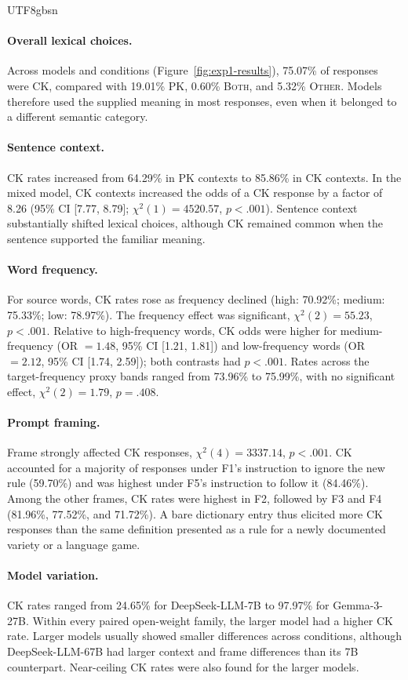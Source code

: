 \documentclass[11pt]{article}
\begin{document}
\begin{CJK*}{UTF8}{gbsn}
\paragraph{Overall lexical choices.}
Across models and conditions (Figure~\ref{fig:exp1-results}), 75.07\% of responses were \textsc{CK}, compared with 19.01\% \textsc{PK}, 0.60\% \textsc{Both}, and 5.32\% \textsc{Other}. Models therefore used the supplied meaning in most responses, even when it belonged to a different semantic category.

\paragraph{Sentence context.}
CK rates increased from 64.29\% in PK contexts to 85.86\% in CK contexts. In the mixed model, CK contexts increased the odds of a CK response by a factor of 8.26 (95\% CI [7.77, 8.79]; $\chi^2(1)=4520.57$, $p<.001$). Sentence context substantially shifted lexical choices, although CK remained common when the sentence supported the familiar meaning.

\paragraph{Word frequency.}
For source words, CK rates rose as frequency declined (high: 70.92\%; medium: 75.33\%; low: 78.97\%). The frequency effect was significant, $\chi^2(2)=55.23$, $p<.001$. Relative to high-frequency words, CK odds were higher for medium-frequency (OR $=1.48$, 95\% CI [1.21, 1.81]) and low-frequency words (OR $=2.12$, 95\% CI [1.74, 2.59]); both contrasts had $p<.001$. Rates across the target-frequency proxy bands ranged from 73.96\% to 75.99\%, with no significant effect, $\chi^2(2)=1.79$, $p=.408$.

\paragraph{Prompt framing.}
Frame strongly affected CK responses, $\chi^2(4)=3337.14$, $p<.001$. CK accounted for a majority of responses under F1's instruction to ignore the new rule (59.70\%) and was highest under F5's instruction to follow it (84.46\%). Among the other frames, CK rates were highest in F2, followed by F3 and F4 (81.96\%, 77.52\%, and 71.72\%). A bare dictionary entry thus elicited more CK responses than the same definition presented as a rule for a newly documented variety or a language game.

\paragraph{Model variation.}
CK rates ranged from 24.65\% for DeepSeek-LLM-7B to 97.97\% for Gemma-3-27B. Within every paired open-weight family, the larger model had a higher CK rate. Larger models usually showed smaller differences across conditions, although DeepSeek-LLM-67B had larger context and frame differences than its 7B counterpart. Near-ceiling CK rates were also found for the larger models.


\end{CJK*}
\end{document}
